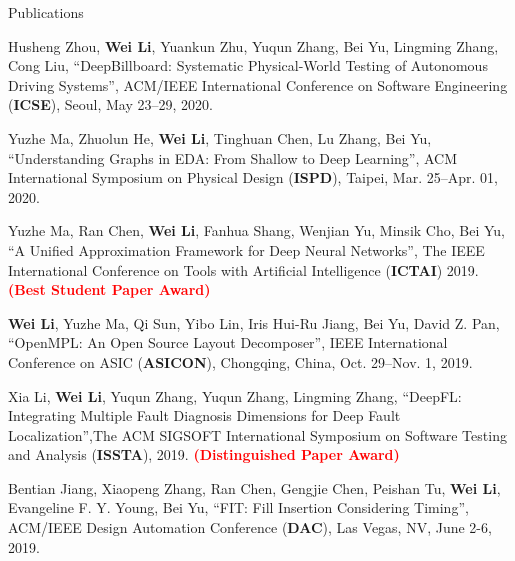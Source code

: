 \begin{rSection}{Publications}
\begin{description}[font=\normalfont]
{}
\item[{[C6]}]{
    Husheng Zhou, \textbf{Wei Li}, Yuankun Zhu, Yuqun Zhang, Bei Yu, Lingming Zhang, Cong Liu, 
    ``DeepBillboard: Systematic Physical-World Testing of Autonomous Driving Systems'', ACM/IEEE International Conference on Software Engineering (\textbf{ICSE}), Seoul, May 23–29, 2020.
}
\item[{[C5]}]{
    Yuzhe Ma, Zhuolun He, \textbf{Wei Li}, Tinghuan Chen, Lu Zhang, Bei Yu, 
    ``Understanding Graphs in EDA: From Shallow to Deep Learning'', ACM International Symposium on Physical Design (\textbf{ISPD}), Taipei, Mar. 25–Apr. 01, 2020.
}
\item[{[C4]}]{
    Yuzhe Ma, Ran Chen, \textbf{Wei Li}, Fanhua Shang, Wenjian Yu, Minsik Cho, Bei Yu, 
    ``A Unified Approximation Framework for Deep Neural Networks'', The IEEE International Conference on Tools with Artificial Intelligence (\textbf{ICTAI}) 2019. \textcolor{red}{\textbf{(Best Student Paper Award)}}
}
\item[{[C3]}]{
    \textbf{Wei Li}, Yuzhe Ma, Qi Sun, Yibo Lin, Iris Hui-Ru Jiang, Bei Yu, David Z. Pan,
    ``OpenMPL: An Open Source Layout Decomposer'', IEEE International Conference on ASIC (\textbf{ASICON}), Chongqing, China, Oct. 29–Nov. 1, 2019. 
}
\item[{[C2]}]{
    Xia Li, \textbf{Wei Li}, Yuqun Zhang, Yuqun Zhang, Lingming Zhang, 
    ``DeepFL: Integrating Multiple Fault Diagnosis Dimensions for Deep Fault Localization'',The ACM SIGSOFT International Symposium on Software Testing and Analysis 
      (\textbf{ISSTA}), 2019. \textcolor{red}{\textbf{(Distinguished Paper Award)}}
}
\item[{[C1]}]{
    Bentian Jiang, Xiaopeng Zhang, Ran Chen, Gengjie Chen, Peishan Tu, \textbf{Wei Li}, Evangeline F. Y. Young, Bei Yu, 
    ``FIT: Fill Insertion Considering Timing'', 
    ACM/IEEE Design Automation Conference (\textbf{DAC}), Las Vegas, NV, June 2-6, 2019.
}


\end{description}


\end{rSection}

